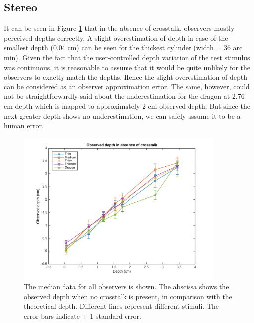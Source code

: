 \subsection{Stereo}
It can be seen in Figure \ref{fig:s_crosstalk_0} that in the absence of crosstalk, observers mostly perceived depths correctly. A slight overestimation of depth in case of the smallest depth (0.04 cm) can be seen for the thickest cylinder (width = 36 arc min). Given the fact that the user-controlled depth variation of the test stimulus was continuous, it is reasonable to assume that it would be quite unlikely for the observers to exactly match the depths. Hence the slight overestimation of depth can be considered as an observer approximation error. The same, however, could not be straightforwardly said about the underestimation for the dragon at 2.76 cm depth which is mapped to approximately 2 cm observed depth. But since the next greater depth shows no underestimation, we can safely assume it to be a human error.
\begin{figure}[H]
\centering
    \includegraphics[width=0.9\textwidth]{./Template_Figures/s_crosstalk_0}
    \caption{The median data for all observers is shown. The abscissa shows the observed depth when no crosstalk is present, in comparison with the theoretical depth. Different lines represent different stimuli. The error bars indicate $\pm$ 1 standard error.\label{fig:s_crosstalk_0}}
\end{figure}


